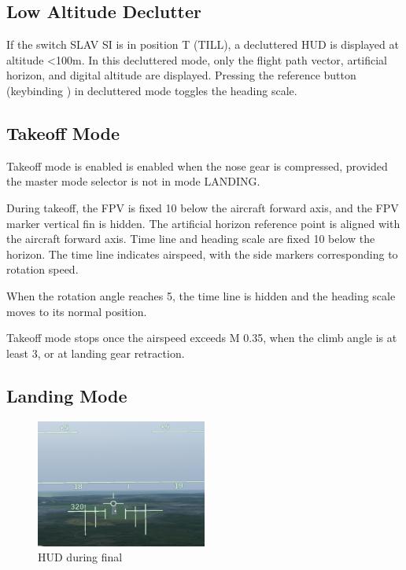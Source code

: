 \subsection{Low Altitude Declutter}
\label{sec:hud-declutter}
If the switch SLAV SI is in position T (TILL), a decluttered HUD is displayed at altitude <100m.
In this decluttered mode, only the flight path vector,
artificial horizon, and digital altitude are displayed.
Pressing the reference button (keybinding )
in decluttered mode toggles the heading scale.

\subsection{Takeoff Mode}
Takeoff mode is enabled is enabled when the nose gear is compressed,
provided the master mode selector is not in mode LANDING.

During takeoff, the FPV is fixed 10\textdegree{} below the aircraft forward axis,
and the FPV marker vertical fin is hidden.
The artificial horizon reference point is aligned with the aircraft forward axis.
Time line and heading scale are fixed 10\textdegree{} below the horizon.
The time line indicates airspeed, with the side markers corresponding to rotation speed.

When the rotation angle reaches 5\textdegree{},
the time line is hidden and the heading scale moves to its normal position.

Takeoff mode stops once the airspeed exceeds M 0.35,
when the climb angle is at least 3\textdegree{},
or at landing gear retraction.

\subsection{Landing Mode}
\begin{figure}[!ht]
  \centering
  \includegraphics[width=0.5\textwidth]{images/displays/ajs-hud-landing.png}
  \caption{HUD during final}
  \label{fig:hud-landing}
\end{figure}

